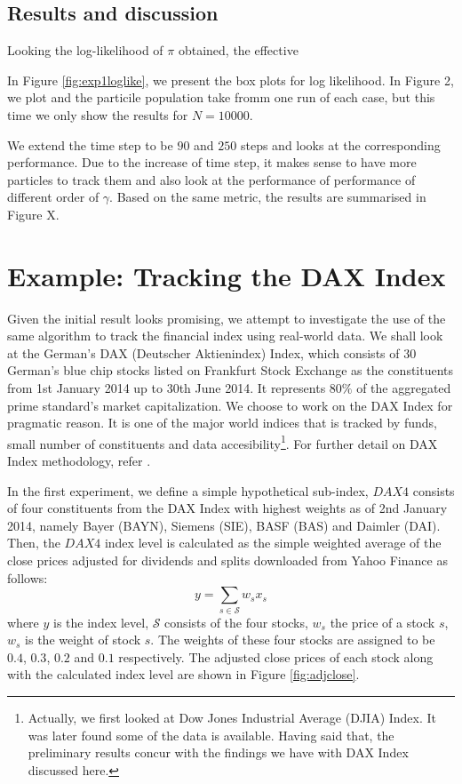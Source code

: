 \subsection{Results and discussion}
Looking the log-likelihood of $\pi$ obtained, the effective 

In Figure \ref{fig:exp1loglike}, we present the box plots for log likelihood. In Figure 2, we plot and the particile population take fromm one run of each case, but this time we only show the results for $N=10000$.

We extend the time step to be $90$ and $250$ steps and looks at the corresponding performance. Due to the increase of time step, it makes sense to have more particles to track them and also look at the performance of performance of different order of $\gamma$. Based on the same metric, the results are summarised in Figure X.
 


\section{Example: Tracking the DAX Index}
\label{sec:exp2}
Given the initial result looks promising, we attempt to investigate the use of the same algorithm to track the financial index using real-world data. We shall look at the German's DAX (Deutscher Aktienindex) Index, which consists of 30 German's blue chip stocks listed on Frankfurt Stock Exchange as the constituents from 1st January 2014 up to 30th June 2014. It represents $80\%$ of the aggregated prime standard's market capitalization. We choose to work on the DAX Index for pragmatic reason. It is one of the major world indices that is tracked by funds, small number of constituents and data accesibility\footnote{Actually, we first looked at Dow Jones Industrial Average (DJIA) Index. It was later found some of the data is available. Having said that, the preliminary results concur with the findings we have with DAX Index discussed here.}. For further detail on DAX Index methodology, refer \cite{DAX14}.
 
In the first experiment, we define a simple hypothetical sub-index, $DAX4$ consists of four constituents from the DAX Index with highest weights as of 2nd January 2014, namely Bayer (BAYN), Siemens (SIE), BASF (BAS) and Daimler (DAI). Then, the $DAX4$ index level is calculated as the simple weighted average of the close prices adjusted for dividends and splits downloaded from Yahoo Finance as follows:
\begin{equation}
  y = \sum_{s \in \mathcal{S}} w_s x_s
\end{equation}
where $y$ is the index level, $\mathcal{S}$ consists of the four stocks, $w_s$ the price of a stock $s$, $w_s$ is the weight of stock $s$. The weights of these four stocks are assigned to be $0.4$, $0.3$, $0.2$ and $0.1$ respectively. The adjusted close prices of each stock along with the calculated index level are shown in Figure \ref{fig:adjclose}.
 
